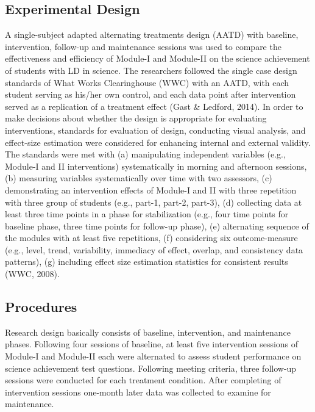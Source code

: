 \documentclass[11.5pt]{sig-alternate} %
\begin{document}
\begin{large}
\subsection*{Experimental Design}
A single-subject adapted alternating treatments design (AATD) with baseline, intervention, follow-up and maintenance sessions was used to compare the effectiveness and efficiency of Module-I and Module-II on the science achievement of students with LD in science. The researchers followed the single case design standards of What Works Clearinghouse (WWC) with an AATD, with each student serving as his/her own control, and each data point after intervention served as a replication of a treatment effect (Gast \& Ledford, 2014). In order to make decisions about whether the design is appropriate for evaluating interventions, standards for evaluation of design, conducting visual analysis, and effect-size estimation were considered for enhancing internal and external validity. The standards were met with (a) manipulating independent variables (e.g., Module-I and II interventions) systematically in morning and afternoon sessions, (b) measuring variables systematically over time with two assessors, (c) demonstrating an intervention effects of Module-I and II with three repetition with three group of students (e.g., part-1, part-2, part-3), (d) collecting data at least three time points in a phase for stabilization (e.g., four time points for baseline phase,  three time points for follow-up phase), (e) alternating sequence of the modules with at least five repetitions, (f) considering six outcome-measure (e.g., level, trend, variability, immediacy of effect, overlap, and consistency data patterns), (g) including effect size estimation statistics for consistent results (WWC, 2008). 

\subsection*{Procedures}
Research design basically consists of baseline, intervention, and maintenance phases. Following four sessions of baseline, at least five intervention sessions of Module-I and Module-II each were alternated to assess student performance on science achievement test questions. Following meeting criteria, three follow-up sessions were conducted for each treatment condition. After completing of intervention sessions one-month later data was collected to examine for maintenance.


\end{large}
\end{document}
